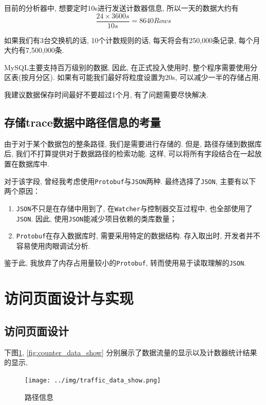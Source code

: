 目前的分析器中, 想要定时10s进行发送计数器信息, 所以一天的数据大约有
$$\frac{24 \times 3600 s}{10s} = 8640 Rows $$

如果我们有3台交换机的话, 10个计数规则的话, 每天将会有250,000条记录,
每个月大约有7,500,000条.

MySQL主要支持百万级别的数据, 因此, 在正式投入使用时,
整个程序需要使用分区表(按月分区).
如果有可能我们最好将粒度设置为20s, 可以减少一半的存储占用.

我建议数据保存时间最好不要超过1个月, 有了问题需要尽快解决.


\subsection{存储trace数据中路径信息的考量}

由于对于某个数据包的整条路径, 我们是需要进行存储的. 但是,
路径存储到数据库后, 我们不打算提供对于数据路径的检索功能. 这样,
可以将所有字段结合在一起放置在数据库中.

对于该字段, 曾经我考虑使用\texttt{Protobuf}与\texttt{JSON}两种.
最终选择了\texttt{JSON}, 主要有以下两个原因：

\begin{enumerate}
\def\labelenumi{\arabic{enumi}.}
\item
  \texttt{JSON}不只是在存储中用到了,
  在\texttt{Watcher}与控制器交互过程中, 也全部使用了\texttt{JSON}. 因此,
  使用\texttt{JSON}能减少项目依赖的类库数量；
\item
  \texttt{Protobuf}在存入数据库时, 需要采用特定的数据结构. 存入取出时,
  开发者并不容易使用肉眼调试分析.
\end{enumerate}

鉴于此, 我放弃了内存占用量较小的\texttt{Protobuf},
转而使用易于读取理解的\texttt{JSON}.


\section{访问页面设计与实现}

\subsection{访问页面设计}

下图\ref{fig:traffic_data_show}, \ref{fig:counter_data_show}
分别展示了数据流量的显示以及计数器统计结果的显示,

\begin{figure}[htbp!]
  \centering
  \texttt{[image: ../img/traffic\_data\_show.png]}
  \caption{路径信息}
  \label{fig:traffic_data_show}
\end{figure}

